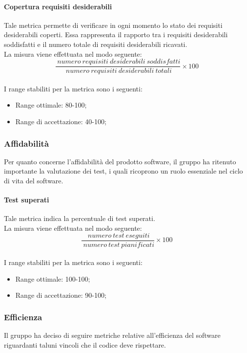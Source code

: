 			\paragraph[Copertura requisiti desiderabili]{\hypertarget{crd}{Copertura requisiti desiderabili}}
			Tale metrica permette di verificare in ogni momento lo stato dei requisiti desiderabili coperti. Essa rappresenta il rapporto tra i requisiti desiderabili soddisfatti e il numero totale di requisiti desiderabili ricavati.
			\\La misura viene effettuata nel modo seguente:
			\begin{equation}
			\frac{~numero~requisiti~desiderabili~soddisfatti}{~numero~requisiti~desiderabili~totali}\times{100}
			\end{equation}
			\\I range stabiliti per la metrica sono i seguenti:
			\begin{itemize}
				\item Range ottimale: 80-100;
				\item Range di accettazione: 40-100;
			\end{itemize}
		\subsubsection{Affidabilità \label{S2}}
		Per quanto concerne l'affidabilità del prodotto software, il gruppo ha ritenuto importante la valutazione dei test, i quali ricoprono un ruolo essenziale nel ciclo di vita del software.
			\paragraph[Test superati]{\hypertarget{ts}{Test superati}}
			Tale metrica indica la percentuale di test superati.
			\\La misura viene effettuata nel modo seguente:
			\begin{equation}
				\frac{~numero~test~eseguiti}{~numero~test~pianificati}\times{100}
			\end{equation}
			\\I range stabiliti per la metrica sono i seguenti:
			\begin{itemize}
				\item Range ottimale: 100-100;
				\item Range di accettazione: 90-100;
			\end{itemize}
		\subsubsection{Efficienza \label{S3}}
		Il gruppo \hx{} ha deciso di seguire metriche relative all'efficienza del software riguardanti taluni vincoli che il codice deve rispettare.
